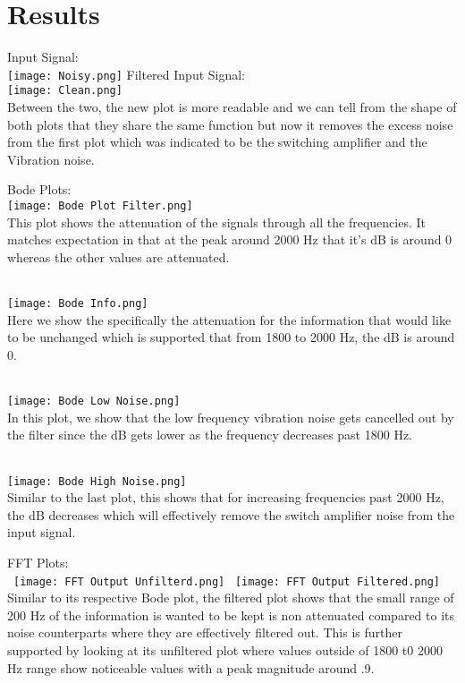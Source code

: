 \documentclass[12pt]{report}
\begin{document}
\section{Results}

Input Signal:
\\ \texttt{[image: Noisy.png]}
\newpage
Filtered Input Signal:
\\ \texttt{[image: Clean.png]}
\\ Between the two, the new plot is more readable and we can tell from the shape of both plots that they share the same function but now it removes the excess noise from the first plot which was indicated to be the switching amplifier and the Vibration noise. 

Bode Plots:
\\ \texttt{[image: Bode Plot Filter.png]}
\\ This plot shows the attenuation of the signals through all the frequencies. It matches expectation in that at the peak around 2000 Hz that it's dB is around 0 whereas the other values are attenuated.

\\ \texttt{[image: Bode Info.png]} 
\\ Here we show the specifically the attenuation for the information that would like to be unchanged which is supported that from 1800 to 2000 Hz, the dB is around 0. 

\\ \texttt{[image: Bode Low Noise.png]}
\\ In this plot, we show that the low frequency vibration noise gets cancelled out by the filter since the dB gets lower as the frequency decreases past 1800 Hz. 

\\ \texttt{[image: Bode High Noise.png]}
\\ Similar to the last plot, this shows that for increasing frequencies past 2000 Hz, the dB decreases which will effectively remove the switch amplifier noise from the input signal. 

FFT Plots:
\\
\ \texttt{[image: FFT Output Unfilterd.png]}
\ \texttt{[image: FFT Output Filtered.png]} 
\\ Similar to its respective Bode plot, the filtered plot shows that the small range of 200 Hz of the information is wanted to be kept is non attenuated compared to its noise counterparts where they are effectively filtered out. This is further supported by looking  at its unfiltered plot where values outside of 1800 t0 2000 Hz range show noticeable values with a peak magnitude around .9. 
\end{document}
